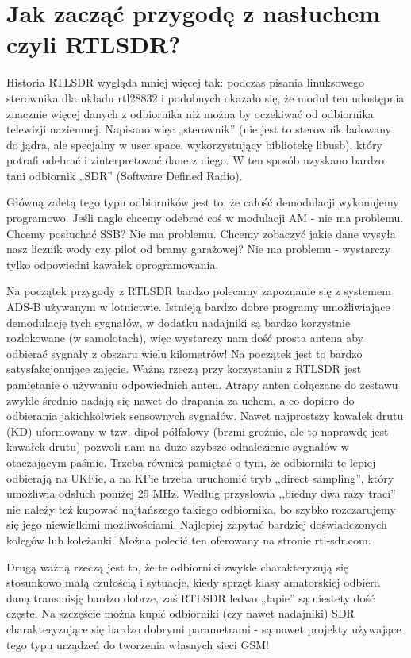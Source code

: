 \documentclass[a4paper,12pt]{article}
\begin{document}
\section{Jak zacząć przygodę z nasłuchem czyli RTLSDR?}
Historia RTLSDR wygląda mniej więcej tak: podczas pisania linuksowego sterownika dla układu rtl28832 i podobnych okazało się, że moduł ten udostępnia znacznie więcej danych z odbiornika niż można by oczekiwać od odbiornika telewizji naziemnej. Napisano więc „sterownik” (nie jest to sterownik ładowany do jądra, ale specjalny w user space, wykorzystujący bibliotekę libusb), który potrafi odebrać i zinterpretować dane z niego. W ten sposób uzyskano bardzo tani odbiornik „SDR” (Software Defined Radio).

Główną zaletą tego typu odbiorników jest to, że całość demodulacji wykonujemy programowo. Jeśli nagle chcemy odebrać coś w modulacji AM - nie ma problemu. Chcemy posłuchać SSB? Nie ma problemu. Chcemy zobaczyć jakie dane wysyła nasz licznik wody czy pilot od bramy garażowej? Nie ma problemu - wystarczy tylko odpowiedni kawałek oprogramowania.

Na początek przygody z RTLSDR bardzo polecamy zapoznanie się z systemem ADS-B używanym w lotnictwie. Istnieją bardzo dobre programy umożliwiające demodulację tych sygnałów, w dodatku nadajniki są bardzo korzystnie rozlokowane (w samolotach), więc wystarczy nam dość prosta antena aby odbierać sygnały z obszaru wielu kilometrów! Na początek jest to bardzo satysfakcjonujące zajęcie.
Ważną rzeczą przy korzystaniu z RTLSDR jest pamiętanie o używaniu odpowiednich anten. Atrapy anten dołączane do zestawu zwykle średnio nadają się nawet do drapania za uchem, a co dopiero do odbierania jakichkolwiek sensownych sygnałów. Nawet najprostszy kawałek drutu (KD) uformowany w tzw. dipol półfalowy (brzmi groźnie, ale to naprawdę jest kawałek drutu) pozwoli nam na dużo szybsze odnalezienie sygnałów w otaczającym paśmie.
Trzeba również pamiętać o tym, że odbiorniki te lepiej odbierają na UKFie, a na KFie trzeba uruchomić tryb ,,direct sampling'', który umożliwia odsłuch poniżej 25 MHz.
Według przysłowia ,,biedny dwa razy traci'' nie należy też kupować najtańszego takiego odbiornika, bo szybko rozczarujemy się jego niewielkimi możliwościami. Najlepiej zapytać bardziej doświadczonych kolegów lub koleżanki.
Można polecić ten oferowany na stronie rtl-sdr.com. 

Drugą ważną rzeczą jest to, że te odbiorniki zwykle charakteryzują się stosunkowo małą czułością i sytuacje, kiedy sprzęt klasy amatorskiej odbiera daną transmisję bardzo dobrze, zaś RTLSDR ledwo „łapie” są niestety dość częste. Na szczęście można kupić odbiorniki (czy nawet nadajniki) SDR charakteryzujące się bardzo dobrymi parametrami - są nawet projekty używające tego typu urządzeń do tworzenia własnych sieci GSM!
\end{document}
